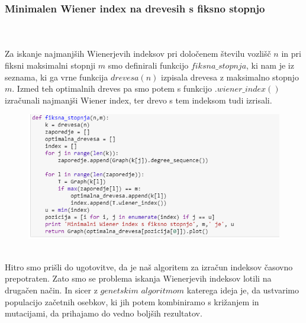 \documentclass[12pt,a4paper]{amsart}
\theoremstyle{definition} %
\theoremstyle{plain} %
\begin{document}
\subsubsection{Minimalen Wiener index na drevesih s fiksno stopnjo}
\
\\
\\
Za iskanje najmanjših Wienerjevih indeksov pri določenem številu vozlišč $n$ in pri fiksni maksimalni stopnji  $m$
smo definirali funkcijo $fiksna\_stopnja$,  ki nam je iz seznama, ki ga vrne funkcija $drevesa(n)$ izpisala drevesa z maksimalno stopnjo $m$. Izmed teh optimalnih dreves pa smo potem s funkcijo $.wiener\_index()$ izračunali najmanjši Wiener index, ter drevo s tem indeksom tudi izrisali.

\begin{figure}[ht]
\centering
\includegraphics[width=1\textwidth]{slika2}
\end{figure}
\pagebreak
\
\\
Hitro smo prišli do ugotovitve, da je naš algoritem za izračun indeksov časovno prepotraten. Zato smo se problema iskanja Wienerjevih indeksov lotili na drugačen način. In sicer z $genetskim$ $algoritmom$ katerega ideja je, da ustvarimo populacijo začetnih osebkov, ki jih potem kombiniramo s križanjem in mutacijami, da prihajamo do vedno boljših rezultatov.
\end{document}
